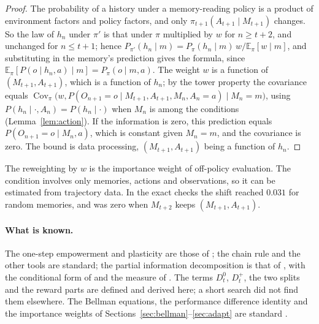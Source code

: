 \documentclass{article}
\theoremstyle{definition}
\theoremstyle{remark}
\newcommand{\E}{\mathbb{E}}
\begin{document}
\begin{proof}
The probability of a history under a memory-reading policy is a product of environment factors and policy factors, and only $\pi_{t+1}(A_{t+1}\mid M_{t+1})$ changes. So the law of $h_n$ under $\pi'$ is that under $\pi$ multiplied by $w$ for $n\ge t+2$, and unchanged for $n\le t+1$; hence $P_{\pi'}(h_n\mid m)=P_\pi(h_n\mid m)\,w/\E_\pi[w\mid m]$, and substituting in the memory's prediction gives the formula, since $\E_\pi[P(o\mid h_n,a)\mid m]=P_\pi(o\mid m,a)$. The weight $w$ is a function of $(M_{t+1},A_{t+1})$, which is a function of $h_n$; by the tower property the covariance equals $\operatorname{Cov}_\pi\big(w,P(O_{n+1}=o\mid M_{t+1},A_{t+1},M_n,A_n=a)\mid M_n=m\big)$, using $P(h_n\mid\cdot,A_n)=P(h_n\mid\cdot)$ when $M_n$ is among the conditions (Lemma~\ref{lem:action}). If the information is zero, this prediction equals $P(O_{n+1}=o\mid M_n,a)$, which is constant given $M_n=m$, and the covariance is zero. The bound is data processing, $(M_{t+1},A_{t+1})$ being a function of $h_n$.
\end{proof}

The reweighting by $w$ is the importance weight of off-policy evaluation. The condition involves only memories, actions and observations, so it can be estimated from trajectory data. In the exact checks the shift reached $0.031$ for random memories, and was zero when $M_{t+2}$ keeps $(M_{t+1},A_{t+1})$.

\paragraph{What is known.} The one-step empowerment and plasticity are those of \citet{abel2025plasticity}; the chain rule and the other tools are standard; the partial information decomposition is that of \citet{williams2010nonnegative}, with the conditional form of \citet{matthias2025novel} and the measure of \citet{bertschinger2014quantifying}. The terms $D^0_t$, $D^+_t$, the two splits and the reward parts are defined and derived here; a short search did not find them elsewhere. The Bellman equations, the performance difference identity and the importance weights of Sections~\ref{sec:bellman}--\ref{sec:adapt} are standard \citep{sutton2018reinforcement}.



\end{document}
